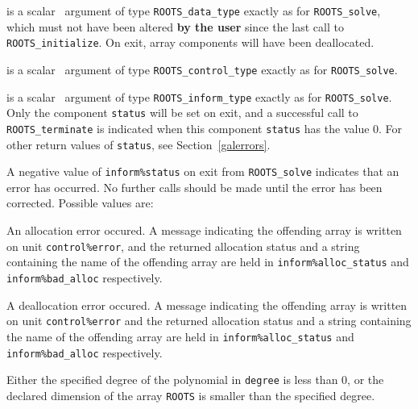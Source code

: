 \documentclass{galahad}
\newcommand{\packagename}{ROOTS}
\begin{document}
\vspace*{-3mm}
\begin{description}

 is a scalar \intentinout\ argument of type 
{\tt \packagename\_data\_type} 
exactly as for
{\tt \packagename\_solve},
which must not have been altered {\bf by the user} since the last call to 
{\tt \packagename\_initialize}.
On exit, array components will have been deallocated.

 is a scalar \intentin\ argument of type 
{\tt \packagename\_control\_type}
exactly as for
{\tt \packagename\_solve}.

 is a scalar \intentout\ argument of type
{\tt \packagename\_inform\_type}
exactly as for
{\tt \packagename\_solve}.
Only the component {\tt status} will be set on exit, and a 
successful call to 
{\tt \packagename\_terminate}
is indicated when this  component {\tt status} has the value 0. 
For other return values of {\tt status}, see Section~\ref{galerrors}.

\end{description}


\galerrors
A negative value of {\tt inform\%status} on exit from 
{\tt \packagename\_solve}
indicates that an error has occurred. No further calls should be made
until the error has been corrected. Possible values are:

\begin{description}

 An allocation error occured. A message indicating 
the offending 
array is written on unit {\tt control\%error}, and the returned allocation 
status and a string containing the name of the offending array
are held in {\tt inform\%alloc\_\-status}
and {\tt inform\%bad\_alloc} respectively.

 A deallocation error occured. 
A message indicating the offending 
array is written on unit {\tt control\%error} and the returned allocation 
status and a string containing the name of the offending array
are held in {\tt inform\%alloc\_\-status}
and {\tt inform\%bad\_alloc} respectively.

Either the specified degree of the polynomial in {\tt degree} is less than 0, 
or the declared dimension of the array {\tt ROOTS} is smaller
than the specified degree.

\end{description}
\end{document}
